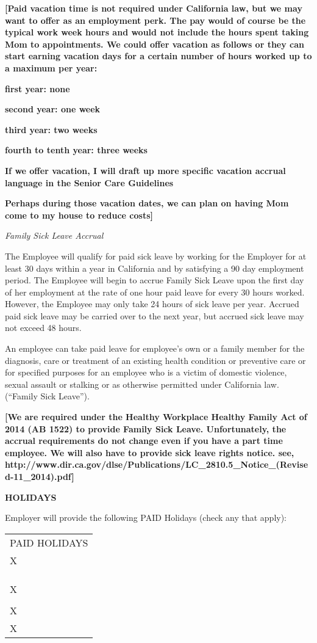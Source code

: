 \documentclass[]{article}
\begin{document}
\textbf{{[}Paid vacation time is not required under California law, but
we may want to offer as an employment perk. The pay would of course be
the typical work week hours and would not include the hours spent taking
Mom to appointments. We could offer vacation as follows or they can
start earning vacation days for a certain number of hours worked up to a
maximum per year: }

\textbf{first year: none}

\textbf{second year: one week}

\textbf{third year: two weeks}

\textbf{fourth to tenth year: three weeks }

\textbf{If we offer vacation, I will draft up more specific vacation
accrual language in the Senior Care Guidelines}

\textbf{Perhaps during those vacation dates, we can plan on having Mom
come to my house to reduce costs{]}}

\emph{Family Sick Leave Accrual}

The Employee will qualify for paid sick leave by working for the
Employer for at least 30 days within a year in California and by
satisfying a 90 day employment period. The Employee will begin to accrue
Family Sick Leave upon the first day of her employment at the rate of
one hour paid leave for every 30 hours worked. However, the Employee may
only take 24 hours of sick leave per year. Accrued paid sick leave may
be carried over to the next year, but accrued sick leave may not exceed
48 hours.

An employee can take paid leave for employee's own or a family member
for the diagnosis, care or treatment of an existing health condition or
preventive care or for specified purposes for an employee who is a
victim of domestic violence, sexual assault or stalking or as otherwise
permitted under California law. (``Family Sick Leave'').

\textbf{{[}We are required under the Healthy Workplace Healthy Family
Act of 2014 (AB 1522) to provide Family Sick Leave. Unfortunately, the
accrual requirements do not change even if you have a part time
employee. We will also have to provide sick leave rights notice. see,
http://www.dir.ca.gov/dlse/Publications/LC\_2810.5\_Notice\_(Revised-11\_2014).pdf{]}}

\textbf{HOLIDAYS}

Employer will provide the following PAID Holidays (check any that
apply):

\begin{tabular}[c]{@{}l@{}}
\toprule
PAID HOLIDAYS\tabularnewline
X\tabularnewline
\tabularnewline
\tabularnewline
\tabularnewline
X\tabularnewline
\tabularnewline
X\tabularnewline
X\tabularnewline
\bottomrule
\end{tabular}
\end{document}
